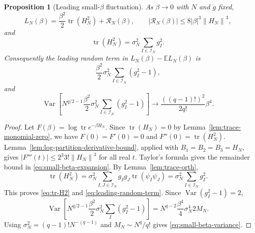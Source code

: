 \documentclass[11pt]{article}
\newtheorem{proposition}[theorem]{Proposition}
\newcommand{\E}{\mathbb{E}}
\newcommand{\Var}{\operatorname{Var}}
\newcommand{\tr}{\operatorname{tr}}
\newcommand{\calI}{\mathcal{I}}
\newcommand{\norm}[1]{\left\lVert #1\right\rVert}
\begin{document}
\begin{proposition}[Leading small-$\beta$ fluctuation]\label{prop:small-beta}
  As $\beta\to0$ with $N$ and $g$ fixed,
  \begin{equation}\label{eq:small-beta-expansion}
    L_N(\beta)
    =
    \frac{\beta^2}{2}\tr(H_N^2)
    +
    \mathcal R_N(\beta),
    \qquad
    |\mathcal R_N(\beta)|
    \leq
    8|\beta|^3\norm{H_N}^3,
  \end{equation}
  and
  \begin{equation}\label{eq:tr-H2}
    \tr(H_N^2)=\sigma_N^2\sum_{I\in\calI_N}g_I^2.
  \end{equation}
  Consequently the leading random term in $L_N(\beta)-\E L_N(\beta)$ is
  \begin{equation}\label{eq:leading-random-term}
    \frac{\beta^2}{2}\sigma_N^2
    \sum_{I\in\calI_N}(g_I^2-1),
  \end{equation}
  and
  \begin{equation}\label{eq:small-beta-variance}
    \Var\left[
      N^{q/2-1}
      \frac{\beta^2}{2}\sigma_N^2
      \sum_{I\in\calI_N}(g_I^2-1)
    \right]
    \to
    \frac{((q-1)!)^2}{2q!}\beta^4.
  \end{equation}
\end{proposition}

\begin{proof}
  Let $F(\beta)=\log\tr e^{-\beta H_N}$.  Since $\tr(H_N)=0$ by
  Lemma~\ref{lem:trace-monomial-zero}, we have $F(0)=F'(0)=0$ and
  $F''(0)=\tr(H_N^2)$.  Lemma~\ref{lem:log-partition-derivative-bound}, applied
  with $B_1=B_2=B_3=H_N$, gives
  $|F'''(t)|\leq2^3 3!\norm{H_N}^3$ for all real $t$.  Taylor's formula gives
  the remainder bound in \eqref{eq:small-beta-expansion}.  By
  Lemma~\ref{lem:trace-orth},
  \begin{equation}\label{eq:tr-H2-proof}
    \tr(H_N^2)
    =
    \sigma_N^2\sum_{I,J\in\calI_N}g_Ig_J\tr(\psi_I\psi_J)
    =
    \sigma_N^2\sum_{I\in\calI_N}g_I^2.
  \end{equation}
  This proves \eqref{eq:tr-H2} and \eqref{eq:leading-random-term}.  Since
  $\Var(g_I^2-1)=2$,
  \begin{equation}\label{eq:small-beta-var-proof}
    \Var\left[
      N^{q/2-1}
      \frac{\beta^2}{2}\sigma_N^2
      \sum_I(g_I^2-1)
    \right]
    =
    N^{q-2}\frac{\beta^4}{4}\sigma_N^4 2M_N.
  \end{equation}
  Using $\sigma_N^2=(q-1)!N^{-(q-1)}$ and $M_N\sim N^q/q!$ gives
  \eqref{eq:small-beta-variance}.
\end{proof}
\end{document}
